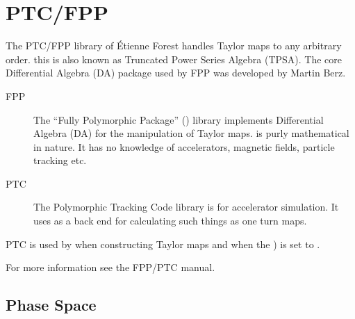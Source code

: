 \chapter{PTC/FPP}
\label{c:ptc}

The PTC/FPP library of \'Etienne
Forest handles Taylor maps to any arbitrary order. this is also known as Truncated Power
Series Algebra (TPSA). The core Differential Algebra (DA) package used by FPP was
developed by Martin Berz\cite{b:berz}.  

\begin{description}
\item[FPP] \Newline
The ``Fully Polymorphic Package'' () library implements Differential Algebra (DA)
for the manipulation of Taylor maps.  is purly mathematical in nature. It has no
knowledge of accelerators, magnetic fields, particle tracking etc.

\item[PTC] \Newline
The Polymorphic Tracking Code  library is for accelerator simulation. It uses
 as a back end for calculating such things as one turn maps.
\end{description}

PTC is used by \bmad when constructing Taylor maps and when the 
) is set to .

For more information see the FPP/PTC manual\cite{b:ptc}.

\section{Phase Space}
\label{s:ptc.space}

